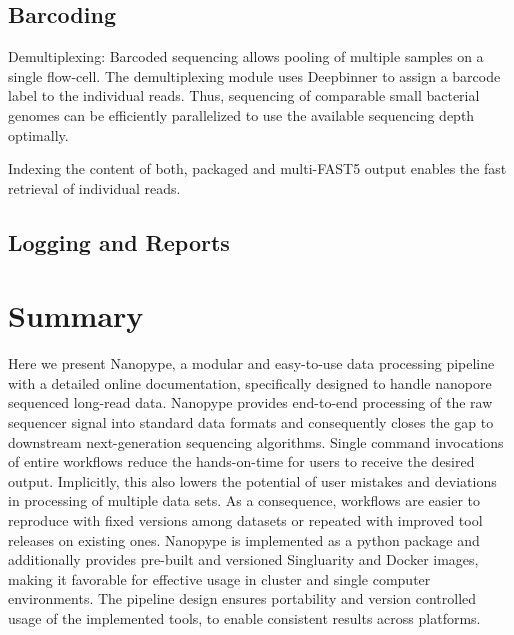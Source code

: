 

\subsection{Barcoding}
Demultiplexing: Barcoded sequencing allows pooling of multiple samples on a single flow-cell. The demultiplexing module uses Deepbinner \cite{Wick2018} to assign a barcode label to the individual reads. Thus, sequencing of comparable small bacterial genomes can be efficiently parallelized to use the available sequencing depth optimally.

Indexing the content of both, packaged and multi-FAST5 output enables the fast retrieval of individual reads. 


\subsection{Logging and Reports}





\section{Summary}
\label{sec:nanopype:summary}
Here we present Nanopype, a modular and easy-to-use data processing pipeline with a detailed online documentation, specifically designed to handle nanopore sequenced long-read data.
Nanopype provides end-to-end processing of the raw sequencer signal into standard data formats and consequently closes the gap to downstream next-generation sequencing algorithms. Single command invocations of entire workflows reduce the hands-on-time for users to receive the desired output. Implicitly, this also lowers the potential of user mistakes and deviations in processing of multiple data sets. As a consequence, workflows are easier to reproduce with fixed versions among datasets or repeated with improved tool releases on existing ones.
Nanopype is implemented as a python package and additionally provides pre-built and versioned Singluarity and Docker images, making it favorable for effective usage in cluster and single computer environments. The pipeline design ensures portability and version controlled usage of the implemented tools, to enable consistent results across platforms.


